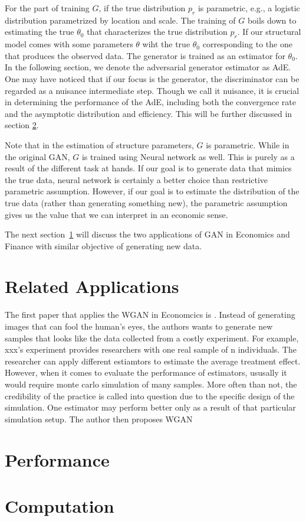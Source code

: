 \documentclass[12pt]{article}
\begin{document}
For the part of training $G$, if the true distribution $p_r$ is parametric,
e.g., a logistic distribution parametrized by location and scale. The training
of $G$ boils down to estimating the true $\theta_0$ that characterizes the true
distribution $p_r$. If our structural model comes with some parameters $\theta$
wiht the true $\theta_0$ corresponding to the one that produces the observed
data. The generator is trained as an estimator for $\theta_0$. In the following
section, we denote the adversarial generator estimator as AdE. One may have
noticed that if our focus is the generator, the discriminator can be regarded
as a nuisance intermediate step. Though we call it nuisance, it is crucial in
determining the performance of the AdE, including both the convergence rate and
the asymptotic distribution and efficiency. This will be further discussed in
section \ref{sec:performance}.

Note that in the estimation of structure parameters, $G$ is parametric. While
in the original GAN, $G$ is trained using Neural network as well. This is
purely as a result of the different task at hands. If our goal is to generate
data that mimics the true data, neural network is certainly a better choice
than restrictive parametric assumption. However, if our goal is to estimate the
distribution of the true data (rather than generating something new), the
parametric assumption gives us the value that we can interpret in an economic
sense.

The next section~\ref{sec:related_applications} will discuss the two
applications of GAN in Economics and Finance with similar objective of
generating new data.

\section{Related Applications} \label{sec:related_applications}

The first paper that applies the WGAN in Economcics is \citet{}. Instead of
generating images that can fool the human's eyes, the authors wants to generate
new samples that looks like the data collected from a costly experiment. For
example, xxx's experiment provides researchers with one real sample of n
individuals. The researcher can apply different estiamtors to estimate the
average treatment effect. However, when it comes to evaluate the performance of
estimators, ususally it would require monte carlo simulation of many samples.
More often than not, the credibility of the practice is called into question
due to the specific design of the simulation. One estimator may perform better
only as a result of that particular simulation setup. The author then proposes
WGAN

\section{Performance} \label{sec:performance}

\section{Computation} \label{sec:computation}
\pagebreak
\newpage

\end{document}
